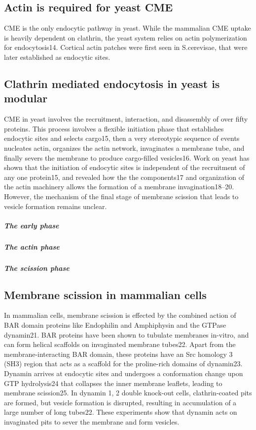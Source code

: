 		\subsection{Actin is required for yeast CME}
CME is the only endocytic pathway in yeast. While the mammalian CME uptake is heavily dependent on clathrin, the yeast system relies on actin polymerization for endocytosis14. Cortical actin patches were first seen in S.cerevisae, that were later established as endocytic sites.  

	
		\subsection{Clathrin mediated endocytosis in yeast is modular}
	CME in yeast involves the recruitment, interaction, and disassembly of over fifty proteins. This process involves a flexible initiation phase that establishes endocytic sites and selects cargo15, then a very stereotypic sequence of events nucleates actin, organizes the actin network, invaginates a membrane tube, and finally severs the membrane to produce cargo-filled vesicles16. Work on yeast has shown that the initiation of endocytic sites is independent of the recruitment of any one protein15, and revealed how the the components17 and organization of the actin machinery allows the formation of a membrane invagination18–20. However, the mechanism of the final stage of membrane scission that leads to vesicle formation remains unclear.

		\subparagraph{The early phase}
		\subparagraph{The actin phase}
		\subparagraph{The scission phase}
		
		
	\subsection{Membrane scission in mammalian cells}
In mammalian cells, membrane scission is effected by the combined action of BAR domain proteins like Endophilin and Amphiphysin and the GTPase dynamin21. BAR proteins have been shown to tubulate membranes in-vitro, and can form helical scaffolds on invaginated membrane tubes22. Apart from the membrane-interacting BAR domain, these proteins have an Src homology 3 (SH3) region that acts as a scaffold for the proline-rich domains of dynamin23. Dynamin arrives at endocytic sites and undergoes a conformation change upon GTP hydrolysis24 that collapses the inner membrane leaflets, leading to membrane scission25. In dynamin 1, 2 double knock-out cells, clathrin-coated pits are formed, but vesicle formation is disrupted, resulting in accumulation of a large number of long tubes22. These experiments show that dynamin acts on invaginated pits to sever the membrane and form vesicles. 


